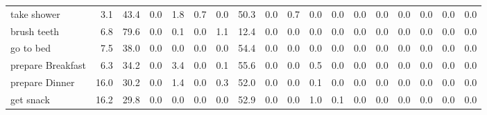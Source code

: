 \documentclass{article}
\begin{document}
\begin{sideways}
\begin{tabular}{lrrrrrrrrrrrrrrrrr}
take shower                   &         3.1 &               43.4 &           0.0 &               1.8 &                0.7 &                0.0 &             50.3 &                      0.0 &                   0.7 &              0.0 &              0.0 &                            0.0 &                      0.0 &                    0.0 &                                  0.0 &                          0.0 &                  0.0 \\
brush teeth                   &         6.8 &               79.6 &           0.0 &               0.1 &                0.0 &                1.1 &             12.4 &                      0.0 &                   0.0 &              0.0 &              0.0 &                            0.0 &                      0.0 &                    0.0 &                                  0.0 &                          0.0 &                  0.0 \\
go to bed                     &         7.5 &               38.0 &           0.0 &               0.0 &                0.0 &                0.0 &             54.4 &                      0.0 &                   0.0 &              0.0 &              0.0 &                            0.0 &                      0.0 &                    0.0 &                                  0.0 &                          0.0 &                  0.0 \\
prepare Breakfast             &         6.3 &               34.2 &           0.0 &               3.4 &                0.0 &                0.1 &             55.6 &                      0.0 &                   0.0 &              0.5 &              0.0 &                            0.0 &                      0.0 &                    0.0 &                                  0.0 &                          0.0 &                  0.0 \\
prepare Dinner                &        16.0 &               30.2 &           0.0 &               1.4 &                0.0 &                0.3 &             52.0 &                      0.0 &                   0.0 &              0.1 &              0.0 &                            0.0 &                      0.0 &                    0.0 &                                  0.0 &                          0.0 &                  0.0 \\
get snack                     &        16.2 &               29.8 &           0.0 &               0.0 &                0.0 &                0.0 &             52.9 &                      0.0 &                   0.0 &              1.0 &              0.1 &                            0.0 &                      0.0 &                    0.0 &                                  0.0 &                          0.0 &                  0.0 \\

\end{tabular}
\end{sideways}
\end{document}
